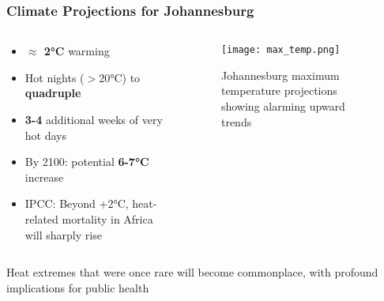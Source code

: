 \documentclass[aspectratio=169]{beamer}
\newcommand{\statistic}[1]{\textcolor{witsaccent}{\textbf{#1}}}
\begin{document}
\begin{frame}
    \frametitle{Climate Projections for Johannesburg}
    
    \begin{columns}[T]
        \begin{column}{0.55\textwidth}
            \begin{impactbox}
                \begin{itemize}[leftmargin=*, itemsep=6pt]
                    \item \statistic{$\approx$ 2°C} warming
                    \item Hot nights ($>$20°C) to \statistic{quadruple}
                    \item \statistic{3-4} additional weeks of very hot days
                \end{itemize}
            \end{impactbox}
            \vspace{0.4cm}
            \begin{itemize}[leftmargin=*, itemsep=8pt]
                \item By 2100: potential \statistic{6-7°C} increase
                \item IPCC: Beyond +2°C, heat-related mortality in Africa will sharply rise
            \end{itemize}
        \end{column}
        \begin{column}{0.42\textwidth}
            \begin{figure}
                \texttt{[image: max\_temp.png]}
                \caption{\small Johannesburg maximum temperature projections showing alarming upward trends}
            \end{figure}
        \end{column}
    \end{columns}
    
    \vspace{0.3cm}
    \begin{keypoint}
        \centering
        Heat extremes that were once rare will become commonplace, with profound implications for public health
    \end{keypoint}
\end{frame}
\end{document}
